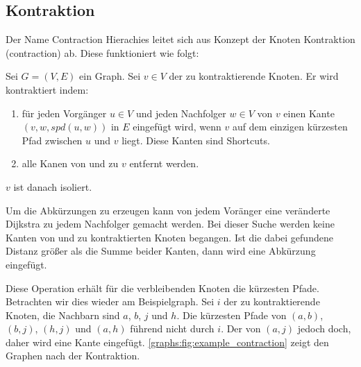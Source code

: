 \subsection{Kontraktion}

Der Name Contraction Hierachies leitet sich aus Konzept der Knoten Kontraktion (contraction) ab.
Diese funktioniert wie folgt:

\begin{definition}
    Sei $G = (V, E)$ ein Graph. Sei $v \in V$ der zu kontraktierende Knoten. Er wird kontraktiert indem:

    \begin{enumerate}
        \item\label{ch:contraction:when_shortcut}
        für jeden Vorgänger $u \in V$ und jeden Nachfolger $w \in V$ von $v$ einen Kante $(v, w, {spd}(u, w))$ in $E$ eingefügt wird, wenn $v$ auf dem einzigen kürzesten Pfad zwischen $u$ und $v$ liegt. Diese Kanten sind Shortcuts.

        \item
              alle Kanen von und zu $v$ entfernt werden.
    \end{enumerate}

    $v$ ist danach isoliert.
\end{definition}

Um die Abkürzungen zu erzeugen kann von jedem Voränger eine veränderte Dijkstra zu jedem Nachfolger gemacht werden.
Bei dieser Suche werden keine Kanten von und zu kontraktierten Knoten begangen.
Ist die dabei gefundene Distanz größer als die Summe beider Kanten, dann wird eine Abkürzung eingefügt.

Diese Operation erhält für die verbleibenden Knoten die kürzesten Pfade.
Betrachten wir dies wieder am Beispielgraph.
Sei $i$ der zu kontraktierende Knoten, die Nachbarn sind $a$, $b$, $j$ und $h$.
Die kürzesten Pfade von $(a, b)$, $(b, j)$, $(h, j)$ und $(a, h)$ führend nicht durch $i$.
Der von $(a, j)$ jedoch doch, daher wird eine Kante eingefügt.
\autoref{graphs:fig:example_contraction} zeigt den Graphen nach der Kontraktion.

